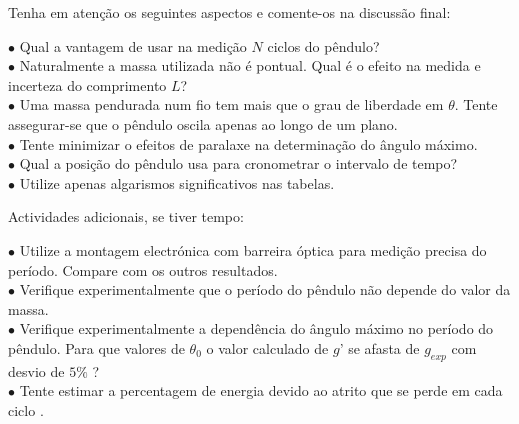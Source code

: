 \documentclass[a4paper,12pt]{article}      %
\begin{document}
Tenha em atenção os seguintes aspectos e comente-os na discussão final:
 \begin{flushleft}
	 $\bullet$ Qual a vantagem de usar na medição $N$ ciclos do pêndulo? \\
	 $\bullet$ Naturalmente a massa utilizada não é pontual. Qual é o efeito na medida e incerteza do comprimento $L$? \\	
	 $\bullet$ Uma massa pendurada num fio tem mais que o grau de liberdade em $\theta$. Tente assegurar-se que o pêndulo oscila apenas ao longo de um plano. \\
	 $\bullet$ Tente minimizar o efeitos de paralaxe na determinação do ângulo máximo.  \\
	 $\bullet$ Qual a posição do pêndulo usa para cronometrar o intervalo de tempo?  \\
	 $\bullet$ Utilize apenas algarismos significativos nas tabelas.
\end{flushleft} 


Actividades adicionais, se tiver tempo:
 \begin{flushleft}
	 $\bullet$ Utilize a montagem electrónica com barreira óptica para medição precisa do período. Compare com os outros resultados.\\
	 $\bullet$ Verifique experimentalmente que o período do pêndulo não depende do valor da massa.\\
	 $\bullet$ Verifique experimentalmente a dependência do ângulo máximo no período do pêndulo. 
	 Para que valores de $\theta_0$ o valor calculado de $g$’ se afasta de $g_{exp}$ com desvio de $5 \%$ ?\\
	 $\bullet$ Tente estimar a percentagem de energia devido ao atrito que se perde em cada ciclo .
\end{flushleft} 

\newpage
\end{document}
